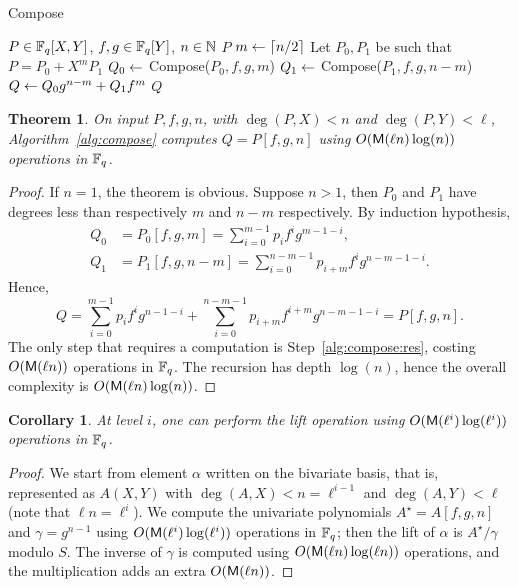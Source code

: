 \documentclass{sig-alternate}
\newtheorem{theorem}[definition]{Theorem}
\newtheorem{corollary}[definition]{Corollary}
\begin{document}
\begin{algorithm}[t]
  \caption{Compose}
  \label{alg:compose}
  \begin{algorithmic}[1]
    \REQUIRE $P\in \mathbb{F}_q[X,Y]$, $f,g\in \mathbb{F}_q[Y]$, $n\in\mathbb{N}$
    \RETURN $P$
    \ELSE
    \STATE $m \leftarrow \lceil n/2\rceil$
    \STATE Let $P_0,P_1$ be such that $P = P_0 + X^mP_1$
    \STATE $Q_0 \leftarrow$ Compose($P_0, f, g, m$)
    \STATE $Q_1 \leftarrow$ Compose($P_1, f, g, n-m$)
    \STATE $Q \leftarrow Q_0g^{n-m} + Q_1f^m$  \label{alg:compose:res}
    \RETURN $Q$
    \ENDIF
  \end{algorithmic}
\end{algorithm}

\begin{theorem}
  \label{th:compose}
  On input $P,f,g,n$, with $\deg(P,X)<n$ and $\deg(P,Y) < \ell$,
  Algorithm~\ref{alg:compose} computes $Q=P[f,g,n]$ using $O(\mathsf{M}(\ell
  n)\log(n))$ operations in $\mathbb{F}_q$.
\end{theorem}
\begin{proof}
  If $n=1$, the theorem is obvious. Suppose $n>1$, then $P_0$ and
  $P_1$ have degrees less than respectively $m$ and $n-m$
  respectively. By induction hypothesis,
  \begin{equation*}
    \begin{aligned}
      Q_0 &= P_0[f,g,m] = \sum_{i=0}^{m-1}p_if^ig^{m-1-i},\\
      Q_1 &= P_1[f,g,n-m] = \sum_{i=0}^{n-m-1}p_{i+m}f^ig^{n-m-1-i}.   
    \end{aligned}
  \end{equation*}
  Hence,
  \begin{equation*}
    Q = \sum_{i=0}^{m-1}p_if^ig^{n-1-i} +
    \sum_{i=0}^{n-m-1}p_{i+m}f^{i+m}g^{n-m-1-i} =
    P[f,g,n].
  \end{equation*}
  The only step that requires a computation is
  Step~\ref{alg:compose:res}, costing $O(\mathsf{M}(\ell n))$ operations in
  $\mathbb{F}_q$. The recursion has depth $\log(n)$, hence the overall
  complexity is $O(\mathsf{M}(\ell n)\log(n))$.
\end{proof}

\begin{corollary}
  At level $i$, one can perform the lift operation using
  $O(\mathsf{M}(\ell^i)\log(\ell^i))$ operations in $\mathbb{F}_q$.
\end{corollary}
\begin{proof}
  We start from element $\alpha$ written on the bivariate basis, that
  is, represented as $A(X,Y)$ with $\deg(A,X)<n=\ell^{i-1}$ and
  $\deg(A,Y)<\ell$ (note that $\ell n =\ell^i$).  We compute the
  univariate polynomials $A^\star=A[f,g,n]$ and $\gamma=g^{n-1}$ using
  $O(\mathsf{M}(\ell^i)\log(\ell^i))$ operations in $\mathbb{F}_q$; then the lift
  of $\alpha$ is $A^\star/\gamma$ modulo $S$. The inverse of $\gamma$
  is computed using $O(\mathsf{M}(\ell n)\log(\ell n))$ operations, and the
  multiplication adds an extra $O(\mathsf{M}(\ell n))$.
\end{proof}
\end{document}
